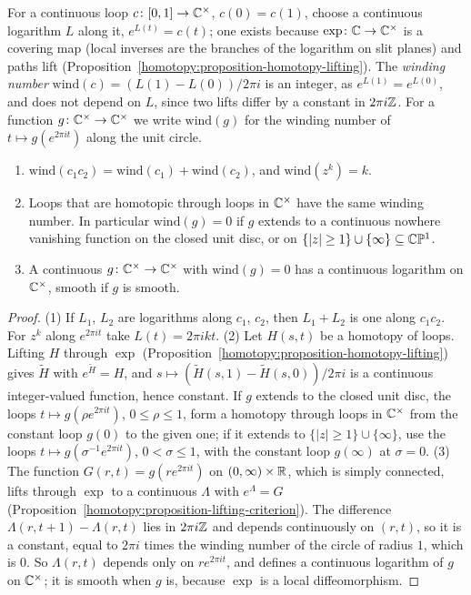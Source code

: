 For a continuous loop $c \colon [0, 1] \to \mathbb{C}^\times$, $c(0) = c(1)$, choose a continuous logarithm $L$ along it, $e^{L(t)} = c(t)$; one exists because $\exp \colon \mathbb{C} \to \mathbb{C}^\times$ is a covering
map (local inverses are the branches of the logarithm on slit planes) and paths lift (Proposition~\ref{homotopy:proposition-homotopy-lifting}). The \emph{winding number}
$\mathrm{wind}(c) = (L(1) - L(0))/2\pi i$ is an integer, as $e^{L(1)} = e^{L(0)}$, and does not depend on $L$, since two lifts differ by a constant in $2\pi i\mathbb{Z}$. For a function
$g \colon \mathbb{C}^\times \to \mathbb{C}^\times$ we write $\mathrm{wind}(g)$ for the winding number of $t \mapsto g(e^{2\pi it})$ along the unit circle.

\begin{lemma}\label{vector-bundles:lemma-winding-number}
\begin{enumerate}
\item $\mathrm{wind}(c_1c_2) = \mathrm{wind}(c_1) + \mathrm{wind}(c_2)$, and $\mathrm{wind}(z^k) = k$.
\item Loops that are homotopic through loops in $\mathbb{C}^\times$ have the same winding number. In particular $\mathrm{wind}(g) = 0$ if $g$ extends to a continuous nowhere vanishing
function on the closed unit disc, or on $\{|z| \geq 1\} \cup \{\infty\} \subseteq \mathbb{C}\mathbb{P}^1$.
\item A continuous $g \colon \mathbb{C}^\times \to \mathbb{C}^\times$ with $\mathrm{wind}(g) = 0$ has a continuous logarithm on $\mathbb{C}^\times$, smooth if $g$ is smooth.
\end{enumerate}
\end{lemma}

\begin{proof}
(1) If $L_1$, $L_2$ are logarithms along $c_1$, $c_2$, then $L_1 + L_2$ is one along $c_1c_2$. For $z^k$ along $e^{2\pi it}$ take $L(t) = 2\pi ikt$. (2) Let $H(s, t)$ be a homotopy of loops.
Lifting $H$ through $\exp$ (Proposition~\ref{homotopy:proposition-homotopy-lifting}) gives $\tilde H$ with $e^{\tilde H} = H$, and $s \mapsto (\tilde H(s, 1) - \tilde H(s, 0))/2\pi i$ is a
continuous integer-valued function, hence constant. If $g$ extends to the closed unit disc, the loops $t \mapsto g(\rho e^{2\pi it})$, $0 \leq \rho \leq 1$, form a homotopy through loops in
$\mathbb{C}^\times$ from the constant loop $g(0)$ to the given one; if it extends to $\{|z| \geq 1\} \cup \{\infty\}$, use the loops $t \mapsto g(\sigma^{-1}e^{2\pi it})$, $0 < \sigma \leq 1$, with the
constant loop $g(\infty)$ at $\sigma = 0$.
(3) The function $G(r, t) = g(re^{2\pi it})$ on $(0, \infty) \times \mathbb{R}$, which is simply connected, lifts through $\exp$ to a continuous $\Lambda$ with $e^\Lambda = G$
(Proposition~\ref{homotopy:proposition-lifting-criterion}). The difference $\Lambda(r, t + 1) - \Lambda(r, t)$ lies in $2\pi i\mathbb{Z}$ and depends continuously on $(r, t)$, so it is a constant, equal to
$2\pi i$ times the winding number of the circle of radius $1$, which is $0$. So $\Lambda(r, t)$ depends only on $re^{2\pi it}$, and defines a continuous logarithm of $g$ on $\mathbb{C}^\times$; it is
smooth when $g$ is, because $\exp$ is a local diffeomorphism.
\end{proof}

